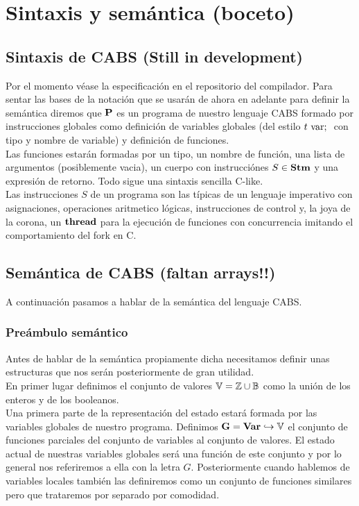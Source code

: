 \chapter{Sintaxis y semántica (boceto)}
\section{Sintaxis de CABS (Still in development)}
Por el momento véase la especificación en el repositorio del compilador. Para sentar las bases de la notación que se usarán de ahora en adelante para definir la semántica diremos que $\P$ es un programa de nuestro lenguaje CABS formado por instrucciones globales como definición de variables globales (del estilo $t \var \;$ con tipo y nombre de variable) y definición de funciones.\\

Las funciones estarán formadas por un tipo, un nombre de función, una lista de argumentos (posiblemente vacia), un cuerpo con instrucciónes $S \in \Stm$ y una expresión de retorno. Todo sigue una sintaxis sencilla C-like.\\

Las instrucciones $S$ de un programa son las típicas de un lenguaje imperativo con asignaciones, operaciones aritmetico lógicas, instrucciones de control y, la joya de la corona, un $\thread$ para la ejecución de funciones con concurrencia imitando el comportamiento del fork en C.
\section{Semántica de CABS (faltan arrays!!)}
A continuación pasamos a hablar de la semántica del lenguaje CABS.
\subsection{Preámbulo semántico}
Antes de hablar de la semántica propiamente dicha necesitamos definir unas estructuras que nos serán posteriormente de gran utilidad.\\

En primer lugar definimos el conjunto de valores $\V = \Z \cup \B$ como la unión de los enteros y de los booleanos.\\

Una primera parte de la representación del estado estará formada por las variables globales de nuestro programa. Definimos $\G = \Var \hookrightarrow \V$ el conjunto de funciones parciales del conjunto de variables al conjunto de valores. El estado actual de nuestras variables globales será una función de este conjunto y por lo general nos referiremos a ella con la letra $G$. Posteriormente cuando hablemos de variables locales también las definiremos como un conjunto de funciones similares pero que trataremos por separado por comodidad.\\

